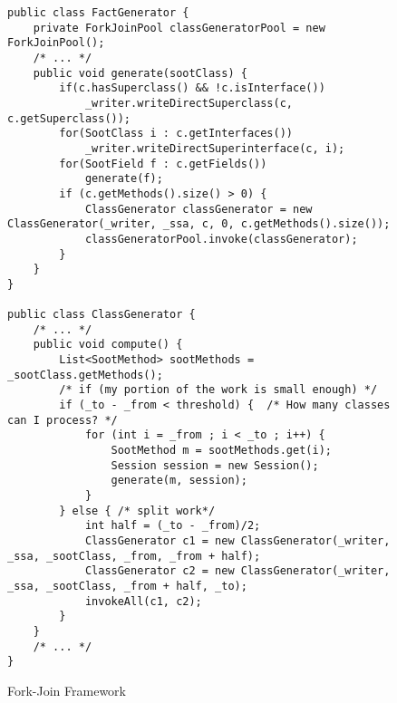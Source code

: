 \documentclass{dithesis}
\begin{document}
        \begin{figure}[H]
\begin{lstlisting}
public class FactGenerator {
    private ForkJoinPool classGeneratorPool = new ForkJoinPool();
    /* ... */
    public void generate(sootClass) {
        if(c.hasSuperclass() && !c.isInterface())
            _writer.writeDirectSuperclass(c, c.getSuperclass());
        for(SootClass i : c.getInterfaces())
            _writer.writeDirectSuperinterface(c, i);
        for(SootField f : c.getFields())
            generate(f);
        if (c.getMethods().size() > 0) {
            ClassGenerator classGenerator = new ClassGenerator(_writer, _ssa, c, 0, c.getMethods().size());
            classGeneratorPool.invoke(classGenerator);
        }
    }
}

public class ClassGenerator {
    /* ... */
    public void compute() {
        List<SootMethod> sootMethods = _sootClass.getMethods();
        /* if (my portion of the work is small enough) */
        if (_to - _from < threshold) {  /* How many classes can I process? */
            for (int i = _from ; i < _to ; i++) {
                SootMethod m = sootMethods.get(i);
                Session session = new Session();
                generate(m, session);
            }
        } else { /* split work*/
            int half = (_to - _from)/2;
            ClassGenerator c1 = new ClassGenerator(_writer, _ssa, _sootClass, _from, _from + half);
            ClassGenerator c2 = new ClassGenerator(_writer, _ssa, _sootClass, _from + half, _to);
            invokeAll(c1, c2);
        }
    }
    /* ... */
}
\end{lstlisting}
        \caption{Fork-Join Framework}
        \end{figure}
\end{document}
